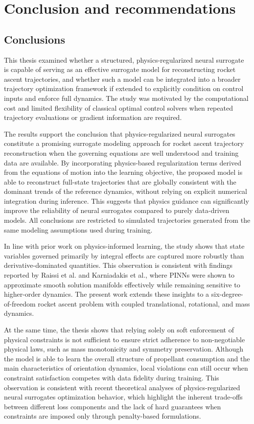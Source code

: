 \chapter{Conclusion and recommendations}
\section{Conclusions}
This thesis examined whether a structured, physics-regularized neural surrogate is capable of 
serving as an effective surrogate model for reconstructing rocket ascent trajectories, and whether 
such a model can be integrated into a broader trajectory optimization framework 
if extended to explicitly condition on control inputs and enforce full dynamics. The study was 
motivated by the computational cost and limited flexibility of classical optimal control solvers 
when repeated trajectory evaluations or gradient information are required.

The results support the conclusion that physics-regularized neural surrogates 
constitute a promising surrogate modeling approach for rocket ascent trajectory reconstruction 
when the governing equations are well understood and training 
data are available. By incorporating physics-based regularization terms derived from the equations of motion into 
the learning objective, the proposed model is able to reconstruct 
full-state trajectories that are globally consistent with the dominant trends 
of the reference dynamics, without relying on explicit numerical integration during 
inference. This suggests that physics guidance can 
significantly improve the reliability of neural surrogates compared to 
purely data-driven models. All conclusions are restricted to simulated trajectories 
generated from the same modeling assumptions used during training.

In line with prior work on physics-informed learning, the study shows that 
state variables governed primarily by integral effects are captured more 
robustly than derivative-dominated quantities. This observation is 
consistent with findings reported by Raissi et al. and Karniadakis et al., 
where PINNs were shown to approximate smooth solution manifolds 
effectively while remaining sensitive to higher-order dynamics. The 
present work extends these insights to a six-degree-of-freedom rocket 
ascent problem with coupled translational, rotational, and mass dynamics.

At the same time, the thesis shows that relying solely on soft enforcement of 
physical constraints is not sufficient to ensure strict adherence to 
non-negotiable physical laws, such as mass monotonicity and symmetry preservation. 
Although the model is able to learn the overall structure of propellant consumption 
and the main characteristics of orientation dynamics, local violations can still 
occur when constraint satisfaction competes with data fidelity during training. 
This observation is consistent with recent theoretical analyses of physics-regularized 
neural surrogates optimization behavior, which highlight the inherent trade-offs 
between different loss components and the lack of hard guarantees when constraints 
are imposed only through penalty-based formulations.

